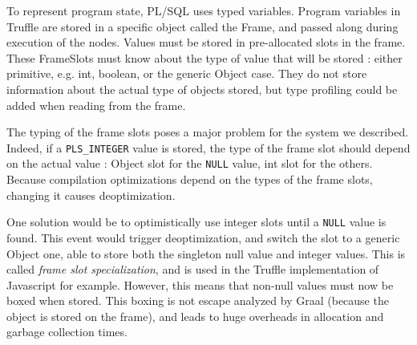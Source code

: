 \documentclass[twoside,11pt,a4paper]{article}
\newcommand{\maybe}[1]{\textit{(maybe ? #1)}}
\newcommand{\java}[1]{\textsf{#1}}
\newcommand{\pls}[1]{\texttt{#1}}
\newcommand{\plstype}[1]{\pls{#1}}
\newcommand{\plsi}{\plstype{PLS\_INTEGER}}
\newcommand{\plsnull}{\pls{NULL}}
\begin{document}

To represent program state, PL/SQL uses typed variables. Program variables in Truffle are stored in a specific object called the \java{Frame}, and passed along during execution of the nodes. Values must be stored in pre-allocated slots in the frame. These \java{FrameSlot}s must know about the type of value that will be stored : either primitive, e.g. \java{int}, \java{boolean}, or the generic \java{Object} case. They do not store information about the actual type of objects stored, but type profiling could be added when reading from the frame.

The typing of the frame slots poses a major problem for the system we described. Indeed, if a \plsi{} value is stored, the type of the frame slot should depend on the actual value : \java{Object} slot for the \plsnull{} value, \java{int} slot for the others. Because compilation optimizations depend on the types of the frame slots, changing it causes deoptimization.

One solution would be to optimistically use integer slots until a \plsnull{} value is found. This event would trigger deoptimization, and switch the slot to a generic \java{Object} one, able to store both the singleton null value and integer values. This is called \textit{frame slot specialization}, and is used in the Truffle implementation of Javascript for example. However, this means that non-null values must now be boxed when stored. This boxing is not escape analyzed by Graal (because the object is stored on the frame), and leads to huge overheads in allocation and garbage collection times.
\end{document}
